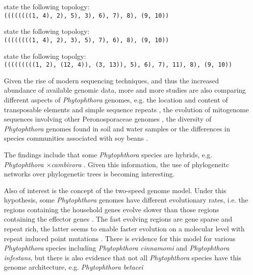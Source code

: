  state the following topology:\\
\texttt{((((((((1, 4), 2), 5), 3), 6), 7), 8), (9, 10))}\cite{kroonGenusPhytophthoraAnno2012}

 state the following topology:\\
\texttt{((((((((1, 4), 2), 3), 5), 7), 6), 8), (9, 10))}\cite{yangExpandedPhylogenyGenus2017}

 state the following topolgy:\\
\texttt{(((((((((1, 2), (12, 4)), (3, 13)), 5), 6), 7), 11), 8), (9, 10))}\cite{abadPhytophthoraTaxonomicPhylogenetic2023a}


Given the rise of modern sequencing techniques, and thus the increased abundance
of available genomic data, more and more studies are also comparing different
aspects of \textit{Phytophthora} genomes, e.g. the location and content of
transposable elements and simple sequence repeats
\cite{mandalComparativeGenomeAnalysis2022}, the evolution of mitogenome
sequences involving other Peronosporaceae genomes
\cite{winkworthComparativeAnalysesComplete2022}, the diversity of
\textit{Phytophthora} genomes found in soil and water samples
\cite{catalaUseGenusSpecificAmplicon2015} or the differences in species
communities associated with soy beans
\cite{navarroComparisonSpeciesCommunities2021}.

The findings include that some \textit{Phytophthora} species are
hybrids, e.g. \textit{Phytophthora $\times$cambivora}
\cite{jungSixNewPhytophthora2017,vanpouckeUnravellingHybridizationPhytophthora2021}.
Given this information, the use of phylogeneitc networks over phylogenetic trees
is becoming interesting. 

Also of interest is the concept of the two-speed genome model. Under this
hypothesis, some \textit{Phytophthora} genomes have different evolutionary
rates, i.e. the regions containing the household genes evolve slower than those
regions containing the effector genes \cite{dongTwospeedGenomesFilamentous2015}.
The fast evolving regions are gene sparse and repeat rich, the latter seems to
enable faster evolution on a molecular level with repeat induced point mutations
\cite{dongTwospeedGenomesFilamentous2015}. There is evidence for this model for
various \textit{Phytophthora} species including \textit{Phytophthora cinnamomi}
\cite{engelbrechtGenomeDestructiveOomycete2021} and \textit{Phytophthora
infestans}\cite{ayala-usmaWholeGenomeDuplication2021,dongTwospeedGenomesFilamentous2015},
but there is also evidence that not all \textit{Phytophthora} species have this
genome architecture, e.g. \textit{Phytophthora betacei}
\cite{ayala-usmaWholeGenomeDuplication2021}

